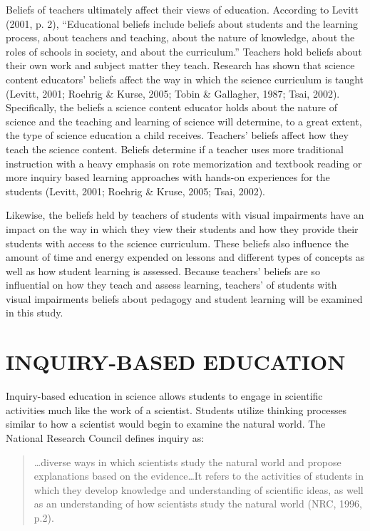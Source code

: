 \documentclass[11.5pt]{sig-alternate} %
\begin{document}
\begin{large}
 Beliefs of teachers ultimately affect their views of education.  According to Levitt (2001, p. 2), “Educational beliefs include beliefs about students and the learning process, about teachers and teaching, about the nature of knowledge, about the roles of schools in society, and about the curriculum.”  Teachers hold beliefs about their own work and subject matter they teach.  Research has shown that science content educators’ beliefs affect the way in which the science curriculum is taught (Levitt, 2001; Roehrig \& Kurse, 2005; Tobin \& Gallagher, 1987; Tsai, 2002).  Specifically, the beliefs a science content educator holds about the nature of science and the teaching and learning of science will determine, to a great extent, the type of science education a child receives. Teachers’ beliefs affect how they teach the science content. Beliefs determine if a teacher uses more traditional instruction with a heavy emphasis on rote memorization and textbook reading or more inquiry based learning approaches with hands-on experiences for the students (Levitt, 2001; Roehrig \& Kruse, 2005; Tsai, 2002).

Likewise, the beliefs held by teachers of students with visual impairments have an impact on the way in which they view their students and how they provide their students with access to the science curriculum. These beliefs also influence the amount of time and energy expended on lessons and different types of concepts as well as how student learning is assessed. Because teachers’ beliefs are so influential on how they teach and assess learning, teachers’ of students with visual impairments beliefs about pedagogy and student learning will be examined in this study.

\section*{INQUIRY-BASED EDUCATION}
		
Inquiry-based education in science allows students to engage in scientific activities much like the work of a scientist.  Students utilize thinking processes similar to how a scientist would begin to examine the natural world.  The National Research Council defines inquiry as: 

\begin{quote}
…diverse ways in which scientists study the natural world and propose explanations based on the evidence…It refers to the activities of students in which they develop knowledge and understanding of scientific ideas, as well as an understanding of how scientists study the natural world (NRC, 1996, p.2).
\end{quote}


\end{large}
\end{document}

